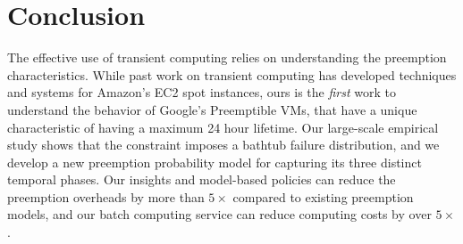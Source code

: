 
 \section{Conclusion}
 \label{sec:conclusion}


 The effective use of transient computing relies on understanding the preemption characteristics.
While past work on transient computing has developed techniques and systems for Amazon's EC2 spot instances, ours is the \emph{first} work to understand the behavior of Google's Preemptible VMs, that have a unique characteristic of having a maximum 24 hour lifetime.
Our large-scale empirical study shows that the constraint imposes a bathtub failure distribution, and we develop a new preemption probability model for capturing its three distinct temporal phases. 
Our insights and model-based policies can reduce the preemption overheads by more than $5\times$ compared to existing preemption models, and our batch computing service can reduce computing costs by over $5\times$. 


\begin{comment}
\noindent \textbf{Acknowledgments.} We wish to thank all the anonymous reviewers and our shepherd Ali R. Butt, for  their insightful comments and feedback.
This research was supported by Google cloud credits for research. 
V.J. was partially supported by NSF through Award DMR-1753182.
\end{comment}



